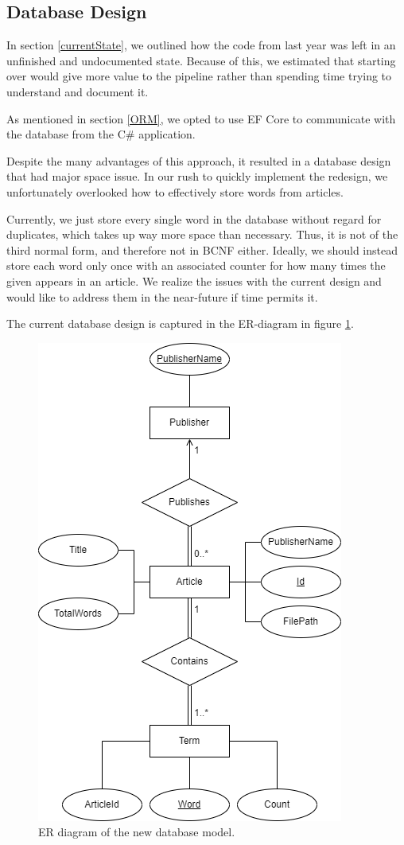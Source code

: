 \subsection{Database Design}\label{InitialDesign}

In section \ref{currentState}, we outlined how the code from last year was left in an unfinished and undocumented state. Because of this, we estimated that starting over would give more value to the pipeline rather than spending time trying to understand and document it.

As mentioned in section \ref{ORM}, we opted to use EF Core to communicate with the database from the C\# application.

Despite the many advantages of this approach, it resulted in a database design that had major space issue.
In our rush to quickly implement the redesign, we unfortunately overlooked how to effectively store words from articles. 

Currently, we just store every single word in the database without regard for duplicates, which takes up way more space than necessary. Thus, it is not of the third normal form, and therefore not in BCNF either.
Ideally, we should instead store each word only once with an associated counter for how many times the given appears in an article.
We realize the issues with the current design and would like to address them in the near-future if time permits it.

The current database design is captured in the ER-diagram in figure \ref{newdatabaseER}.

\begin{figure}[htb!]
    \centering
    \includegraphics[scale=0.6]{Images/New database model.png}
    \caption{ER diagram of the new database model.}
    \label{newdatabaseER}
\end{figure}

